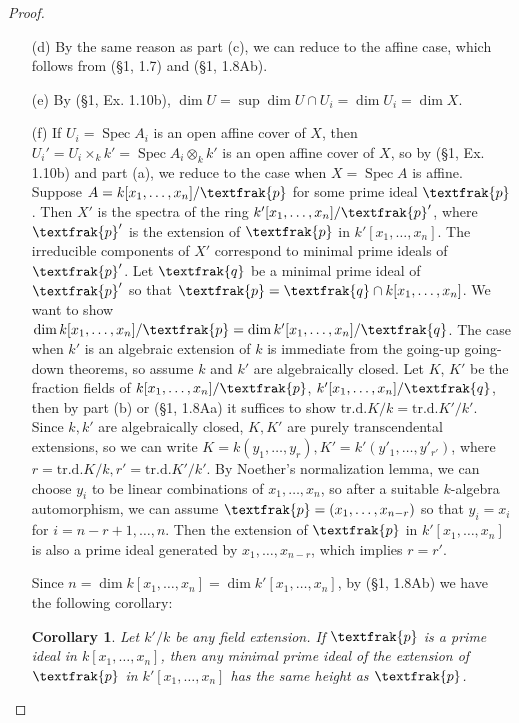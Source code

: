 \documentclass{article}
\newcommand{\goth}[1]{\textfrak{#1}}
\DeclareMathOperator{\spec}{Spec}
\newtheorem{corollary}{Corollary}
\begin{document}
\begin{enumerate} [label=\textbf{\arabic*.}, leftmargin=0em]
\begin{proof}
\begin{itemize} [leftmargin=0cm]
    \item[(d)] By the same reason as part (c), we can reduce to the affine case, which follows from (\S 1, 1.7) and (\S 1, 1.8Ab). 

    \item[(e)] By (\S 1, Ex. 1.10b), $\dim{U} = \sup{\dim{U \cap U_i}} = \dim{U_i} = \dim{X}$. 

    \item[(f)] If $U_i = \spec{A_i}$ is an open affine cover of $X$, then $U_i' = U_i \times_k k' = \spec{A_i \otimes_k k'}$ is an open affine cover of $X$, so by (\S 1, Ex. 1.10b) and part (a), we reduce to the case when $X = \spec{A}$ is affine. Suppose $A = k[x_1, \dots, x_n] / \goth{p}$ for some prime ideal $\goth{p}$. Then $X'$ is the spectra of the ring $k'[x_1, \dots, x_n]/\goth{p}'$, where $\goth{p}'$ is the extension of $\goth{p}$ in $k'[x_1, \dots, x_n]$. The irreducible components of $X'$ correspond to minimal prime ideals of $\goth{p}'$. Let $\goth{q}$ be a minimal prime ideal of $\goth{p}'$ so that $\goth{p} = \goth{q} \cap k[x_1, \dots, x_n]$. We want to show $\dim{k[x_1, \dots, x_n] / \goth{p}} = \dim{k'[x_1, \dots, x_n] / \goth{q}}$. The case when $k'$ is an algebraic extension of $k$ is immediate from the going-up going-down theorems, so assume $k$ and $k'$ are algebraically closed. Let $K$, $K'$ be the fraction fields of $k[x_1, \dots, x_n] / \goth{p}$, $k'[x_1, \dots, x_n] / \goth{q}$, then by part (b) or (\S 1, 1.8Aa) it suffices to show $\text{tr.d.} K/k = \text{tr.d.} K'/k'$. Since $k, k'$ are algebraically closed, $K, K'$ are purely transcendental extensions, so we can write $K = k(y_1, \dots, y_r), K' = k'(y'_1, \dots, y'_{r'})$, where $r = \text{tr.d.}K/k, r' = \text{tr.d.}K'/k'$. By Noether's normalization lemma, we can choose $y_i$ to be linear combinations of $x_1, \dots, x_n$, so after a suitable $k$-algebra automorphism, we can assume $\goth{p} = (x_1, \dots, x_{n - r})$ so that $y_i = x_i$ for $i = n - r + 1, \dots, n$. Then the extension of $\goth{p}$ in $k'[x_1, \dots, x_n]$ is also a prime ideal generated by $x_1, \dots, x_{n - r}$, which implies $r = r'$.
    
    Since $n = \dim{k[x_1, \dots, x_n]} = \dim{k'[x_1, \dots, x_n]}$, by (\S 1, 1.8Ab) we have the following corollary:
    \begin{corollary}
        Let $k'/k$ be any field extension. If $\goth{p}$ is a prime ideal in $k[x_1, \dots, x_n]$, then any minimal prime ideal of the extension of $\goth{p}$ in $k'[x_1, \dots, x_n]$ has the same height as $\goth{p}$.
    \end{corollary}
\end{itemize}


\end{proof}
\end{enumerate}
\end{document}
